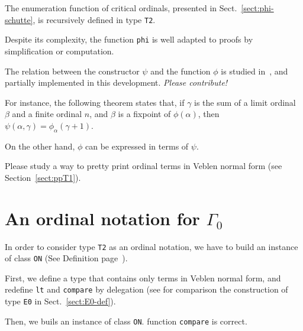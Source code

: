 The enumeration function of critical ordinals, presented in Sect.~\vref{sect:phi-schutte}, is recursively defined in type \texttt{T2}.



Despite its complexity, the function \texttt{phi} is well adapted to proofs by simplification or computation.


The relation between the constructor $\psi$ and the function $\phi$ is
studied in~\cite{schutte}, and partially implemented in this development.
\emph{Please contribute!}
 
For instance, the following theorem states that, if $\gamma$ is the sum of a limit ordinal $\beta$ and a finite ordinal $n$, and $\beta$ is a fixpoint of
$\phi(\alpha)$, then $\psi(\alpha,\gamma)=\phi_\alpha(\gamma+1)$.







On the other hand, $\phi$ can be expressed in terms of $\psi$.




\begin{project}
Please study a way to pretty print ordinal terms in Veblen normal form (see Section~\vref{sect:ppT1}).
\end{project}

\section{An ordinal notation for \texorpdfstring{$\Gamma_0$}{\texttt{Gamma0}}}

In order to consider type \texttt{T2} as an ordinal notation, we have to build an instance of class \texttt{ON} (See Definition page~\pageref{types:ON}).

First, we define a type that contains only terms in Veblen normal form, and redefine \texttt{lt} and \texttt{compare} by delegation (see for comparison the construction of type \texttt{E0} in Sect.~\vref{sect:E0-def}).





Then, we buils an instance of class \texttt{ON}. 
function \texttt{compare} is correct.







